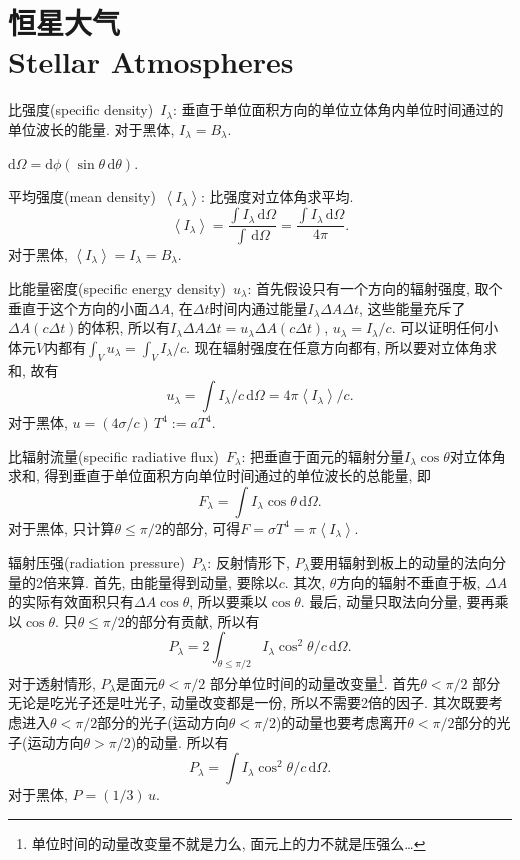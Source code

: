 \chapter{恒星大气\\Stellar Atmospheres}

比强度(specific density)~$I_\lambda$: 垂直于单位面积方向的单位立体角内单位时间通过的单位波长的能量. 对于黑体, $I_\lambda=B_\lambda$.

$\mathrm{d}\Omega=\mathrm{d}\phi(\sin\theta\,\mathrm{d}\theta)$.

平均强度(mean density)~$\left\langle I_\lambda\right\rangle $: 比强度对立体角求平均.
\begin{equation*}
    \left\langle I_\lambda\right\rangle = \frac{\int I_\lambda \,\mathrm{d}\Omega}{\int \,\mathrm{d}\Omega}=\frac{\int I_\lambda \,\mathrm{d}\Omega}{4\pi}.
\end{equation*}
对于黑体, $\left\langle I_\lambda\right\rangle=I_\lambda=B_\lambda$.

比能量密度(specific energy density)~$u_\lambda$: 首先假设只有一个方向的辐射强度, 取个垂直于这个方向的小面$\Delta A$, 在$\Delta t$时间内通过能量$I_\lambda \Delta A \Delta t$, 这些能量充斥了$\Delta A (c \Delta t)$的体积, 所以有$I_\lambda \Delta A \Delta t = u_\lambda \Delta A (c \Delta t)$, $u_\lambda = I_\lambda/c$. 可以证明任何小体元$V$内都有$\int_V u_\lambda = \int_V I_\lambda/c$. 现在辐射强度在任意方向都有, 所以要对立体角求和, 故有
\begin{equation*}
    u_\lambda = \int I_\lambda/c\,\mathrm{d}\Omega = 4\pi\left\langle I_\lambda\right\rangle/c.
\end{equation*}
对于黑体, $u=(4\sigma/c)\,T^4:=aT^4$.

比辐射流量(specific radiative flux)~$F_\lambda$: 把垂直于面元的辐射分量$I_\lambda\cos\theta$对立体角求和, 得到垂直于单位面积方向单位时间通过的单位波长的总能量, 即
\begin{equation*}
    F_\lambda = \int I_\lambda \cos\theta \,\mathrm{d}\Omega.
\end{equation*}
对于黑体, 只计算$\theta\le\pi/2$的部分, 可得$F=\sigma T^4=\pi \left\langle I_\lambda\right\rangle$.

辐射压强(radiation pressure)~$P_\lambda$: 反射情形下, $P_\lambda$要用辐射到板上的动量的法向分量的2倍来算. 首先, 由能量得到动量, 要除以$c$. 其次, $\theta$方向的辐射不垂直于板, $\Delta A$的实际有效面积只有$\Delta A \cos\theta$, 所以要乘以$\cos\theta$. 最后, 动量只取法向分量, 要再乘以$\cos\theta$. 只$\theta\le\pi/2$的部分有贡献, 所以有
\begin{equation*}
    P_\lambda = 2\int_{\theta\le\pi/2} I_\lambda\cos^2\theta/c \,\mathrm{d}\Omega.
\end{equation*}
对于透射情形, $P_\lambda$是面元$\theta<\pi/2$ 部分单位时间的动量改变量\footnote{单位时间的动量改变量不就是力么, 面元上的力不就是压强么\dots}. 首先$\theta<\pi/2$ 部分无论是吃光子还是吐光子, 动量改变都是一份, 所以不需要2倍的因子. 其次既要考虑进入$\theta<\pi/2$部分的光子(运动方向$\theta<\pi/2$)的动量也要考虑离开$\theta<\pi/2$部分的光子(运动方向$\theta>\pi/2$)的动量. 所以有
\begin{equation*}
    P_\lambda = \int I_\lambda\cos^2\theta/c \,\mathrm{d}\Omega.
\end{equation*}
对于黑体, $P=(1/3)\,u$.

